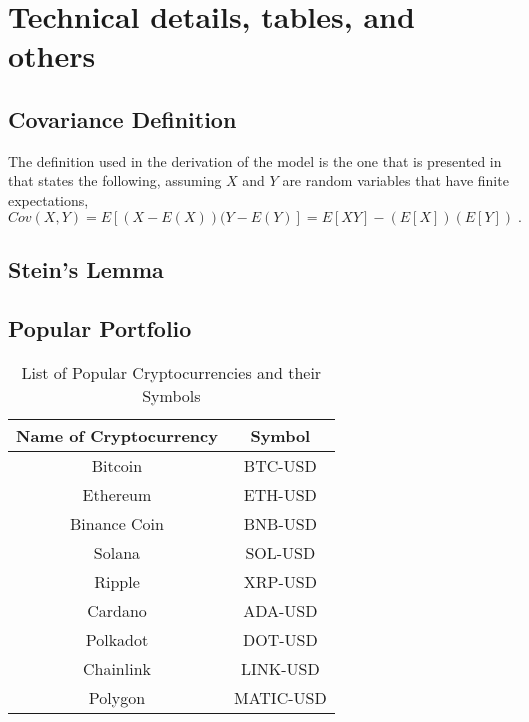 
\chapter{Technical details, tables, and others}
\label{app_a}

\section{Covariance Definition}
\label{app: cov-def}
The definition used in the derivation of the model is the one that is presented in \parencite{Intro-prob-roussas} that states the following, assuming $X$ and $Y$ are random variables that have finite expectations,
\begin{equation}
	Cov(X,Y) = E\left[(X-E(X))(Y-E(Y)\right] = E\left[XY\right] - (E\left[X\right])(E\left[Y\right])\;.
\end{equation}

\section{Stein's Lemma}
\label{app: steins lemma}

\section{Popular Portfolio}
\begin{table}[h!]
	\centering
	\begin{tabular}{|c|c|}
		\hline
		\textbf{Name of Cryptocurrency} & \textbf{Symbol} \\ \hline
		Bitcoin & BTC-USD \\ \hline
		Ethereum & ETH-USD \\ \hline
		Binance Coin & BNB-USD \\ \hline
		Solana & SOL-USD \\ \hline
		Ripple & XRP-USD \\ \hline
		Cardano & ADA-USD \\ \hline
		Polkadot & DOT-USD \\ \hline
		Chainlink & LINK-USD \\ \hline
		Polygon & MATIC-USD \\ \hline
	\end{tabular}
	\caption{List of Popular Cryptocurrencies and their Symbols}
	\label{tab:cryptos}
\end{table}